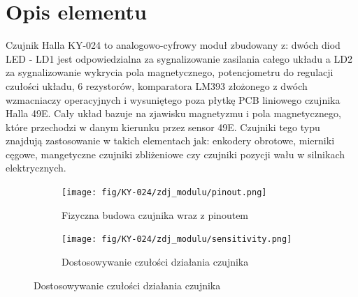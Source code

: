 \documentclass[11pt, a4paper]{article}
\author{Jakub Grzesiak}
\begin{document}
%
%
\newpage

\section*{Opis elementu}
Czujnik Halla KY-024 to analogowo-cyfrowy moduł zbudowany z: dwóch diod LED - LD1 jest odpowiedzialna za sygnalizowanie zasilania całego układu a LD2 za sygnalizowanie wykrycia pola magnetycznego, potencjometru do regulacji czułości układu, 6 rezystorów, komparatora LM393 złożonego z dwóch wzmacniaczy operacyjnych i wysuniętego poza płytkę PCB liniowego czujnika Halla 49E. Cały układ bazuje na zjawisku magnetyzmu i pola magnetycznego, które przechodzi w danym kierunku przez sensor 49E. Czujniki tego typu znajdują zastosowanie w takich elementach jak: enkodery obrotowe, mierniki cęgowe, mangetyczne czujniki zbliżeniowe czy czujniki pozycji wału w silnikach elektrycznych.


\vspace{0.25cm}
\begin{figure}[h]
\centering
\begin{subfigure}{.47\textwidth}
\centering
\texttt{[image: fig/KY-024/zdj\_modulu/pinout.png]}
\caption{Fizyczna budowa czujnika wraz z pinoutem}
\label{fig:_zdjecie_elementu}
\end{subfigure}%
\begin{subfigure}{.6\textwidth}
\centering
\texttt{[image: fig/KY-024/zdj\_modulu/sensitivity.png]}
\caption{Dostosowywanie czułości działania czujnika}
\label{fig:_zasada_dzialania_czulosc}
\end{subfigure}
\label{fig:element}
\end{figure}
\vspace{0.25cm}
\end{document}

